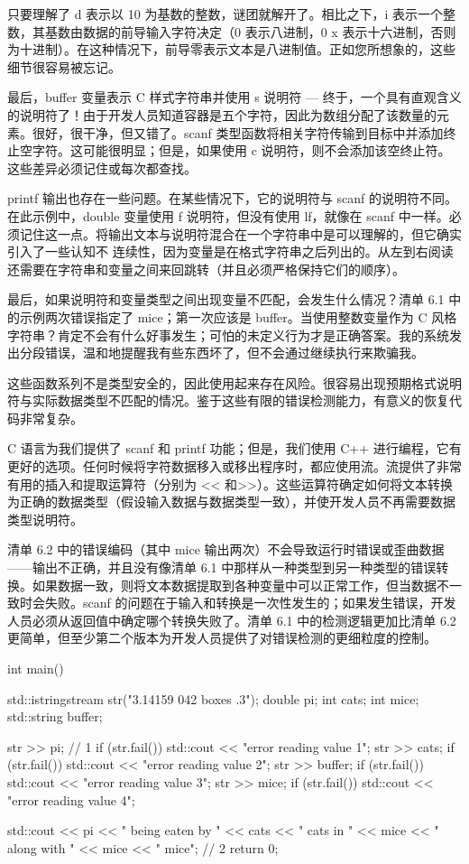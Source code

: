 只要理解了 d 表示以 10 为基数的整数，谜团就解开了。相比之下，i 表示一个整数，其基数由数据的前导输入字符决定（0 表示八进制，0 x 表示十六进制，否则为十进制）。在这种情况下，前导零表示文本是八进制值。正如您所想象的，这些细节很容易被忘记。

最后，buffer 变量表示 C 样式字符串并使用 s 说明符 — 终于，一个具有直观含义的说明符了！由于开发人员知道容器是五个字符，因此为数组分配了该数量的元素。很好，很干净，但又错了。scanf 类型函数将相关字符传输到目标中并添加终止空字符。这可能很明显；但是，如果使用 c 说明符，则不会添加该空终止符。这些差异必须记住或每次都查找。

printf 输出也存在一些问题。在某些情况下，它的说明符与 scanf 的说明符不同。在此示例中，double 变量使用 f 说明符，但没有使用 lf，就像在 scanf 中一样。必须记住这一点。将输出文本与说明符混合在一个字符串中是可以理解的，但它确实引入了一些认知不 连续性，因为变量是在格式字符串之后列出的。从左到右阅读还需要在字符串和变量之间来回跳转（并且必须严格保持它们的顺序）。

最后，如果说明符和变量类型之间出现变量不匹配，会发生什么情况？清单 6.1 中的示例两次错误指定了 mice；第一次应该是 buffer。当使用整数变量作为 C 风格字符串？肯定不会有什么好事发生；可怕的未定义行为才是正确答案。我的系统发出分段错误，温和地提醒我有些东西坏了，但不会通过继续执行来欺骗我。

这些函数系列不是类型安全的，因此使用起来存在风险。很容易出现预期格式说明符与实际数据类型不匹配的情况。鉴于这些有限的错误检测能力，有意义的恢复代码非常复杂。


C 语言为我们提供了 scanf 和 printf 功能；但是，我们使用 C++ 进行编程，它有更好的选项。任何时候将字符数据移入或移出程序时，都应使用流。流提供了非常有用的插入和提取运算符（分别为 <{}< 和>{}>）。这些运算符确定如何将文本转换为正确的数据类型（假设输入数据与数据类型一致），并使开发人员不再需要数据类型说明符。

清单 6.2 中的错误编码（其中 mice 输出两次）不会导致运行时错误或歪曲数据——输出不正确，并且没有像清单 6.1 中那样从一种类型到另一种类型的错误转换。如果数据一致，则将文本数据提取到各种变量中可以正常工作，但当数据不一致时会失败。scanf 的问题在于输入和转换是一次性发生的；如果发生错误，开发人员必须从返回值中确定哪个转换失败了。清单 6.1 中的检测逻辑更加比清单 6.2 更简单，但至少第二个版本为开发人员提供了对错误检测的更细粒度的控制。


\begin{cpp}
int main() {
  std::istringstream str("3.14159 042 boxes .3");
  double pi;
  int cats;
  int mice;
  std::string buffer;

  str >> pi; // 1
  if (str.fail())
    std::cout << "error reading value 1\n";
  str >> cats;
  if (str.fail())
    std::cout << "error reading value 2\n";
  str >> buffer;
  if (str.fail())
    std::cout << "error reading value 3\n";
  str >> mice;
  if (str.fail())
    std::cout << "error reading value 4\n";

  std::cout << pi << " being eaten by " << cats << " cats in " << mice
    << " along with " << mice << " mice\n"; // 2
  return 0;
}
\end{cpp}

